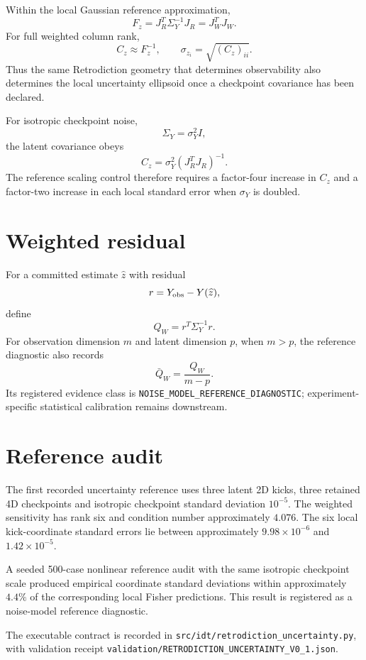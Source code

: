 Within the local Gaussian reference approximation,
\[
\boxed{
F_z
=J_R^T\Sigma_Y^{-1}J_R
=J_W^TJ_W.
}
\]
For full weighted column rank,
\[
\boxed{
C_z\approx F_z^{-1},
\qquad
\sigma_{z_i}=\sqrt{(C_z)_{ii}}.
}
\]
Thus the same Retrodiction geometry that determines observability also determines the local uncertainty ellipsoid once a checkpoint covariance has been declared.

For isotropic checkpoint noise,
\[
\Sigma_Y=\sigma_Y^2 I,
\]
the latent covariance obeys
\[
\boxed{
C_z=\sigma_Y^2(J_R^TJ_R)^{-1}.
}
\]
The reference scaling control therefore requires a factor-four increase in \(C_z\) and a factor-two increase in each local standard error when \(\sigma_Y\) is doubled.

\section{Weighted residual}

For a committed estimate \(\widehat z\) with residual
\[
r=Y_{\rm obs}-Y(\widehat z),
\]
define
\[
\boxed{
Q_W=r^T\Sigma_Y^{-1}r.
}
\]
For observation dimension \(m\) and latent dimension \(p\), when \(m>p\), the reference diagnostic also records
\[
\boxed{
\bar Q_W=\frac{Q_W}{m-p}.
}
\]
Its registered evidence class is \texttt{NOISE\_MODEL\_REFERENCE\_DIAGNOSTIC}; experiment-specific statistical calibration remains downstream.

\section{Reference audit}

The first recorded uncertainty reference uses three latent 2D kicks, three retained 4D checkpoints and isotropic checkpoint standard deviation \(10^{-5}\). The weighted sensitivity has rank six and condition number approximately \(4.076\). The six local kick-coordinate standard errors lie between approximately \(9.98\times10^{-6}\) and \(1.42\times10^{-5}\).

A seeded 500-case nonlinear reference audit with the same isotropic checkpoint scale produced empirical coordinate standard deviations within approximately \(4.4\%\) of the corresponding local Fisher predictions. This result is registered as a noise-model reference diagnostic.

The executable contract is recorded in \texttt{src/idt/retrodiction\_uncertainty.py}, with validation receipt \texttt{validation/RETRODICTION\_UNCERTAINTY\_V0\_1.json}.

